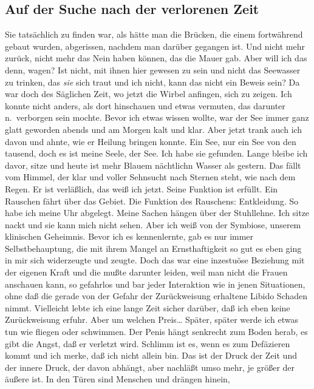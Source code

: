 \documentclass[
]{article}
\author{}
\date{\vspace{-2.5em}}
\begin{document}
\subsection{Auf der Suche nach der verlorenen
Zeit}\label{auf-der-suche-nach-der-verlorenen-zeit}

Sie tatsächlich zu finden war, als hätte man die Brücken, die einem
fortwährend gebaut wurden, abgerissen, nachdem man darüber gegangen ist.
Und nicht mehr zurück, nicht mehr das Nein haben können, das die Mauer
gab. Aber will ich das denn, wagen? Ist nicht, mit ihnen hier gewesen zu
sein und nicht das Seewasser zu trinken, das \emph{sie }sich traut und
ich nicht, kann das nicht ein Beweis sein? Da war doch des Säglichen
Zeit, wo jetzt die Wirbel anfingen, sich zu zeigen. Ich konnte nicht
anders, als dort hinschauen und etwas vermuten, das darunter
n.~verborgen sein mochte. Bevor ich etwas wissen wollte, war der See
immer ganz glatt geworden abends und am Morgen kalt und klar. Aber jetzt
trank auch ich davon und ahnte, wie er Heilung bringen konnte. Ein See,
nur ein See von den tausend, doch es ist meine Seele, der See. Ich habe
sie gefunden. Lange bleibe ich davor, sitze und heute ist mehr Blauem
nächtlichn Wasser als gestern. Das fällt vom Himmel, der klar und voller
Sehnsucht nach Sternen steht, wie nach dem Regen. Er ist verläßlich, das
weiß ich jetzt. Seine Funktion ist erfüllt. Ein Rauschen fährt über das
Gebiet. Die Funktion des Rauschens: Entkleidung. So habe ich meine Uhr
abgelegt. Meine Sachen hängen über der Stuhllehne. Ich sitze nackt und
sie kann mich nicht sehen. Aber ich weiß von der Symbiose, unserem
klinischen Geheimnis. Bevor ich es kennenlernte, gab es nur immer
Selbstbehauptung, die mit ihrem Mangel an Ernsthaftigkeit so gut es eben
ging in mir sich widerzeugte und zeugte. Doch das war eine inzestuöse
Beziehung mit der eigenen Kraft und die mußte darunter leiden, weil man
nicht die Frauen anschauen kann, so gefahrlos und bar jeder Interaktion
wie in jenen Situationen, ohne daß die gerade von der Gefahr der
Zurückweisung erhaltene Libido Schaden nimmt. Vielleicht lebte ich eine
lange Zeit sicher darüber, daß ich eben keine Zurückweisung erfuhr. Aber
um welchen Preis\ldots{} Später, später werde ich etwas tun wie fliegen
oder schwimmen. Der Penis hängt senkrecht zum Boden herab, es gibt die
Angst, daß er verletzt wird. Schlimm ist es, wenn es zum Defäzieren
kommt und ich merke, daß ich nicht allein bin. Das ist der Druck der
Zeit und der innere Druck, der davon abhängt, aber nachläßt umso mehr,
je größer der äußere ist. In den Türen sind Menschen und drängen hinein,
\end{document}
